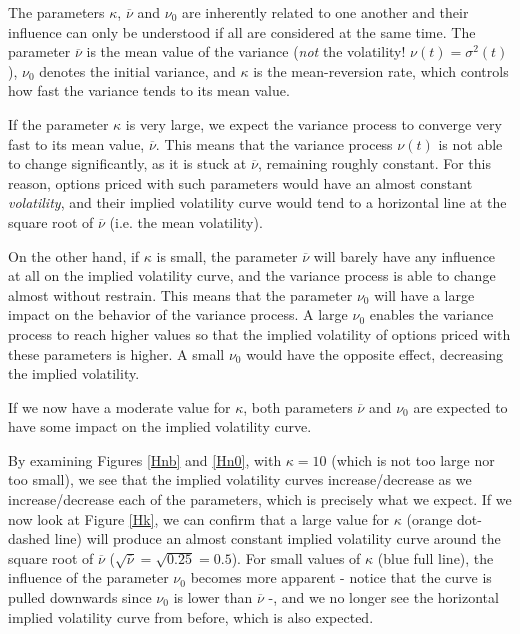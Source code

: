 The parameters $\kappa$, $\overline{\nu}$ and $\nu_0$ are inherently related to one another and their influence can only be understood if all are considered at the same time. The parameter $\overline{\nu}$ is the mean value of the variance (\emph{not} the volatility! $\nu(t)=\sigma^2(t)$), $\nu_0$ denotes the initial variance, and $\kappa$ is the mean-reversion rate, which controls how fast the variance tends to its mean value.

If the parameter $\kappa$ is very large, we expect the variance process to converge very fast to its mean value, $\overline{\nu}$. This means that the variance process $\nu(t)$ is not able to change significantly, as it is stuck at $\overline{\nu}$, remaining roughly constant. For this reason, options priced with such parameters would have an almost constant \emph{volatility}, and their implied volatility curve would tend to a horizontal line at the square root of $\overline{\nu}$ (i.e. the mean volatility).

On the other hand, if $\kappa$ is small, the parameter $\overline{\nu}$ will barely have any influence at all on the implied volatility curve, and the variance process is able to change almost without restrain. This means that the parameter $\nu_0$ will have a large impact on the behavior of the variance process. A large $\nu_0$ enables the variance process to reach higher values so that the implied volatility of options priced with these parameters is higher. A small $\nu_0$ would have the opposite effect, decreasing the implied volatility.

If we now have a moderate value for $\kappa$, both parameters $\overline{\nu}$ and $\nu_0$ are expected to have some impact on the implied volatility curve.

By examining Figures \autoref{Hnb} and \autoref{Hn0}, with $\kappa=10$ (which is not too large nor too small), we see that the implied volatility curves increase/decrease as we increase/decrease each of the parameters, which is precisely what we expect.
If we now look at Figure \autoref{Hk}, we can confirm that a large value for $\kappa$ (orange dot-dashed line) will produce an almost constant implied volatility curve around the square root of $\overline{\nu}$ ($\sqrt{\overline{\nu}}=\sqrt{0.25}=0.5$).
For small values of $\kappa$ (blue full line), the influence of the parameter $\nu_0$ becomes more apparent - notice that the curve is pulled downwards since $\nu_0$ is lower than $\overline{\nu}$ -, and we no longer see the horizontal implied volatility curve from before, which is also expected.

